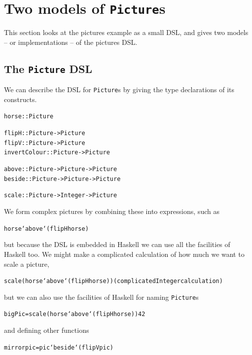 \section{Two models of \texttt{Picture}s}
\label{two-models}


This section looks at the pictures example as a small DSL, and gives two models -- or implementations -- of the pictures DSL.

\subsection*{The \texttt{Picture} DSL}

We can describe the DSL for \texttt{Picture}s by giving the type declarations of its constructs.
\begin{alltt}
horse        :: Picture

flipH        :: Picture -> Picture
flipV        :: Picture -> Picture
invertColour :: Picture -> Picture

above        :: Picture -> Picture -> Picture
beside       :: Picture -> Picture -> Picture

scale        :: Picture -> Integer -> Picture
\end{alltt}
We form complex pictures by combining these into expressions, such as
\begin{alltt}
horse `above` (flipH horse)
\end{alltt}
but because the DSL is embedded in Haskell we can use all the facilities of Haskell too.  We might make a complicated calculation of how much we want to scale a picture,
\begin{alltt}
scale (horse `above` (flipH horse)) (complicated Integer calculation)
\end{alltt}
but we can also use the facilities of Haskell for naming \texttt{Picture}s 
\begin{alltt}
bigPic = scale (horse `above` (flipH horse)) 42
\end{alltt}
and defining other functions
\begin{alltt}
mirror pic = pic `beside` (flipV pic)
\end{alltt}


